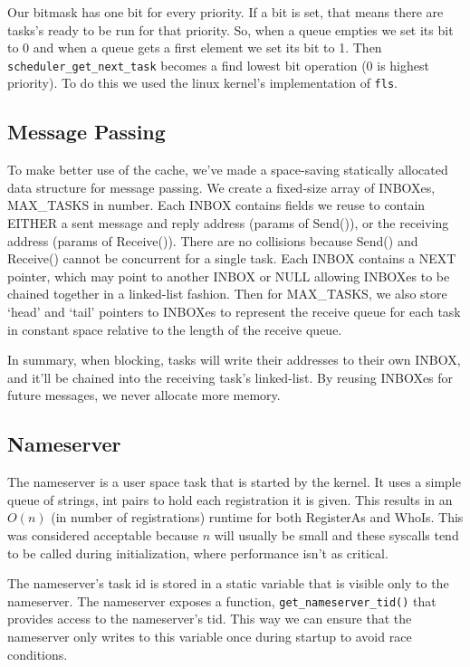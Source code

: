 \documentclass[letterpaper]{article}
\begin{document}
Our bitmask has one bit for every priority. If a bit is set, that means there are tasks's ready to be run for that priority. So, when a queue empties we set its bit to 0 and when a queue gets a first element we set its bit to 1. Then {\tt scheduler\_get\_next\_task} becomes a find lowest bit operation (0 is highest priority). To do this we used the linux kernel's implementation of {\tt fls}.

\subsection{Message Passing}

To make better use of the cache, we've made a space-saving statically allocated data structure for message passing. We create a fixed-size array of INBOXes, MAX\_TASKS in number. Each INBOX contains fields we reuse to contain EITHER a sent message and reply address (params of Send()), or the receiving address (params of Receive()). There are no collisions because Send() and Receive() cannot be concurrent for a single task. Each INBOX contains a NEXT pointer, which may point to another INBOX or NULL allowing INBOXes to be chained together in a linked-list fashion. Then for MAX\_TASKS, we also store `head' and `tail' pointers to INBOXes to represent the receive queue for each task in constant space relative to the length of the receive queue.

In summary, when blocking, tasks will write their addresses to their own INBOX, and it'll be chained into the receiving task's linked-list. By reusing INBOXes for future messages, we never allocate more memory.

\subsection{Nameserver}

The nameserver is a user space task that is started by the kernel. It uses a simple queue of strings, int pairs to hold each registration it is given. This results in an $O(n)$ (in number of registrations) runtime for both RegisterAs and WhoIs. This was considered acceptable because $n$ will usually be small and these syscalls tend to be called during initialization, where performance isn't as critical.

The nameserver's task id is stored in a static variable that is visible only to the nameserver. The nameserver exposes a function, {\tt get\_nameserver\_tid()} that provides access to the nameserver's tid. This way we can ensure that the nameserver only writes to this variable once during startup to avoid race conditions.
\end{document}
